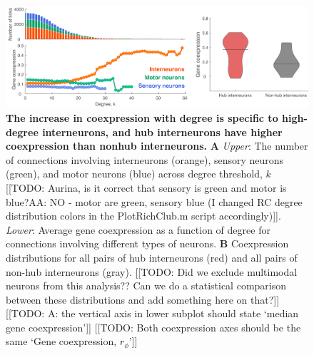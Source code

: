 \documentclass[10pt,letterpaper]{article}
\begin{document}
\begin{figure}[h]
\centering
   \includegraphics[width=1\textwidth]{TypeDegree.pdf}
 \caption{
\textbf{The increase in coexpression with degree is specific to high-degree interneurons, and hub interneurons have higher coexpression than nonhub interneurons.}
\textbf{A} \emph{Upper}: The number of connections involving interneurons (orange), sensory neurons (green), and motor neurons (blue) across degree threshold, $k$ [[TODO: Aurina, is it correct that sensory is green and motor is blue?AA: NO - motor are green, sensory blue (I changed RC degree distribution colors in the PlotRichClub.m script accordingly)]].
\emph{Lower}: Average gene coexpression as a function of degree for connections involving different types of neurons.
\textbf{B} Coexpression distributions for all pairs of hub interneurons (red) and all pairs of non-hub interneurons (gray).
[[TODO: Did we exclude multimodal neurons from this analysis?? Can we do a statistical comparison between these distributions and add something here on that?]]
[[TODO: A: the vertical axis in lower subplot should state `median gene coexpression']]
[[TODO: Both coexpression axes should be the same `Gene coexpression, $r_\phi$']]
 \label{fig:interneuron_dep}
}
\end{figure}
\end{document}
